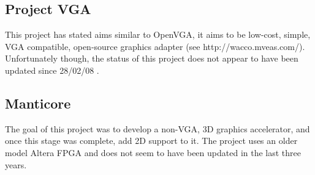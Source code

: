 \subsection{Project VGA}


This project has stated aims similar to OpenVGA, it aims to be low-cost, simple,
VGA compatible, open-source graphics adapter (see http://wacco.mveas.com/).
Unfortunately though, the status of this project does not appear to have been
updated since 28/02/08 .


\subsection{Manticore}
The goal of this project was to develop a non-VGA, 3D graphics accelerator, and
once this stage was complete, add 2D support to it. The project uses an older model
Altera FPGA and does not seem to have been updated in the last three years.
